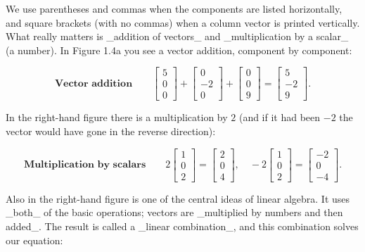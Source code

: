 We use parentheses and commas when the components are listed horizontally, and square brackets (with no commas) when a column vector is printed vertically. What really matters is _addition of vectors_ and _multiplication by a scalar_ (a number). In Figure 1.4a you see a vector addition, component by component:

\[\textbf{Vector addition}\qquad\begin{bmatrix}5\\ 0\\ 0\end{bmatrix}+\begin{bmatrix}0\\ -2\\ 0\end{bmatrix}+\begin{bmatrix}0\\ 0\\ 9\end{bmatrix}=\begin{bmatrix}5\\ -2\\ 9\end{bmatrix}.\]

In the right-hand figure there is a multiplication by \(2\) (and if it had been \(-2\) the vector would have gone in the reverse direction):

\[\textbf{Multiplication by scalars}\qquad 2\begin{bmatrix}1\\ 0\\ 2\end{bmatrix}=\begin{bmatrix}2\\ 0\\ 4\end{bmatrix},\quad-2\begin{bmatrix}1\\ 0\\ 2\end{bmatrix}=\begin{bmatrix}-2\\ 0\\ -4\end{bmatrix}.\]

Also in the right-hand figure is one of the central ideas of linear algebra. It uses _both_ of the basic operations; vectors are _multiplied by numbers and then added_. The result is called a _linear combination_, and this combination solves our equation:

